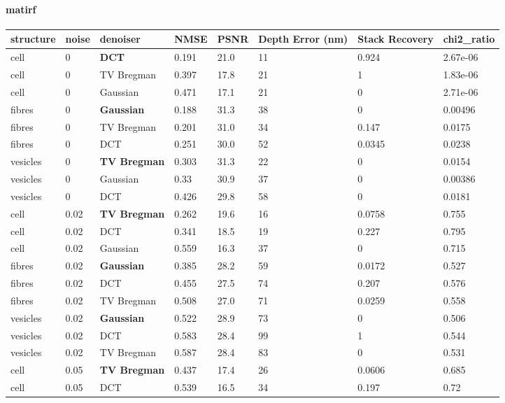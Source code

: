 \paragraph{matirf}
\begin{center}\begin{adjustbox}{max width=\linewidth}
\begin{tabular}{llllllll}
\toprule
structure & noise & denoiser & NMSE & PSNR & Depth Error (nm) & Stack Recovery & chi2\_ratio \\
\midrule
cell & 0 & \textbf{DCT} & 0.191 & 21.0 & 11 & 0.924 & 2.67e-06 \\
cell & 0 & TV Bregman & 0.397 & 17.8 & 21 & 1 & 1.83e-06 \\
cell & 0 & Gaussian & 0.471 & 17.1 & 21 & 0 & 2.71e-06 \\
fibres & 0 & \textbf{Gaussian} & 0.188 & 31.3 & 38 & 0 & 0.00496 \\
fibres & 0 & TV Bregman & 0.201 & 31.0 & 34 & 0.147 & 0.0175 \\
fibres & 0 & DCT & 0.251 & 30.0 & 52 & 0.0345 & 0.0238 \\
vesicles & 0 & \textbf{TV Bregman} & 0.303 & 31.3 & 22 & 0 & 0.0154 \\
vesicles & 0 & Gaussian & 0.33 & 30.9 & 37 & 0 & 0.00386 \\
vesicles & 0 & DCT & 0.426 & 29.8 & 58 & 0 & 0.0181 \\
cell & 0.02 & \textbf{TV Bregman} & 0.262 & 19.6 & 16 & 0.0758 & 0.755 \\
cell & 0.02 & DCT & 0.341 & 18.5 & 19 & 0.227 & 0.795 \\
cell & 0.02 & Gaussian & 0.559 & 16.3 & 37 & 0 & 0.715 \\
fibres & 0.02 & \textbf{Gaussian} & 0.385 & 28.2 & 59 & 0.0172 & 0.527 \\
fibres & 0.02 & DCT & 0.455 & 27.5 & 74 & 0.207 & 0.576 \\
fibres & 0.02 & TV Bregman & 0.508 & 27.0 & 71 & 0.0259 & 0.558 \\
vesicles & 0.02 & \textbf{Gaussian} & 0.522 & 28.9 & 73 & 0 & 0.506 \\
vesicles & 0.02 & DCT & 0.583 & 28.4 & 99 & 1 & 0.544 \\
vesicles & 0.02 & TV Bregman & 0.587 & 28.4 & 83 & 0 & 0.531 \\
cell & 0.05 & \textbf{TV Bregman} & 0.437 & 17.4 & 26 & 0.0606 & 0.685 \\
cell & 0.05 & DCT & 0.539 & 16.5 & 34 & 0.197 & 0.72 \\

\end{tabular}
\end{adjustbox}
\end{center}
